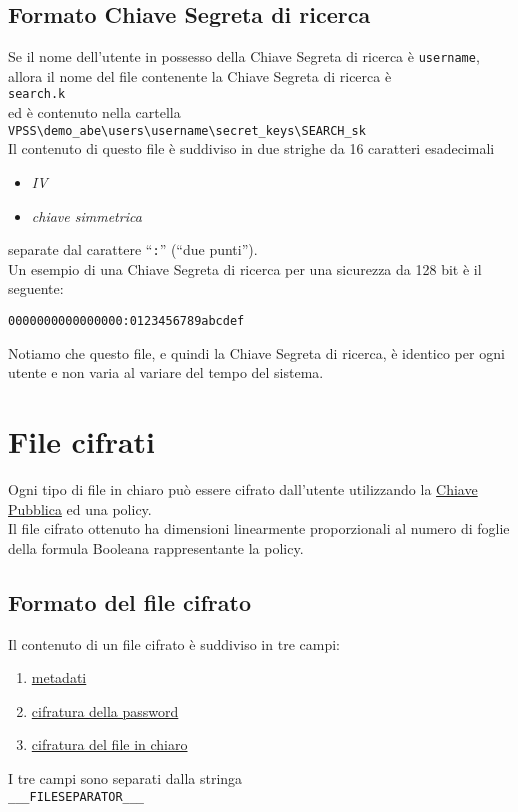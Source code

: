 \documentclass[a4paper,twoside,10pt,openany]{scrbook}
\begin{document}
\subsection{Formato Chiave Segreta di ricerca}\label{sec:format_searchk}
%
Se il nome dell'utente in possesso della Chiave Segreta di ricerca è \texttt{username}, 
allora il nome del file contenente la Chiave Segreta di ricerca è \\
\texttt{search.k}\\
ed è contenuto nella cartella\\
\texttt{VPSS\textbackslash demo\_abe\textbackslash users\textbackslash username\textbackslash secret\_keys\textbackslash SEARCH\_sk}\\
Il contenuto di questo file è suddiviso in due strighe da 16 caratteri esadecimali
\begin{itemize}
 \item \emph{IV}
 \item \emph{chiave simmetrica}
\end{itemize}
separate dal carattere ``\texttt{:}'' (``due punti'').\\
Un esempio di una Chiave Segreta di ricerca per una sicurezza da 128 bit è il seguente:
\begin{verbatim}
0000000000000000:0123456789abcdef
\end{verbatim}
Notiamo che questo file, e quindi la Chiave Segreta di ricerca, è identico per ogni utente e non varia al variare del tempo del sistema.
%
\section{File cifrati}\label{sec:ct}
Ogni tipo di file in chiaro può essere cifrato dall'utente utilizzando la \hyperref[sec:pk]{Chiave Pubblica} ed una policy. \\
Il file cifrato ottenuto ha dimensioni linearmente proporzionali al numero di foglie della formula Booleana rappresentante la policy.
%
\subsection{Formato del file cifrato}\label{sec:format_ct}
%
Il contenuto di un file cifrato è suddiviso in tre campi:
\begin{enumerate}
 \item \hyperref[sec:ct_meta]{metadati}
 \item \hyperref[sec:ct_abeenc]{cifratura della password}
 \item \hyperref[sec:ct_symenc]{cifratura del file in chiaro}
\end{enumerate}
I tre campi sono separati dalla stringa \\
\texttt{\_\_\_FILESEPARATOR\_\_\_}
%
\end{document}
